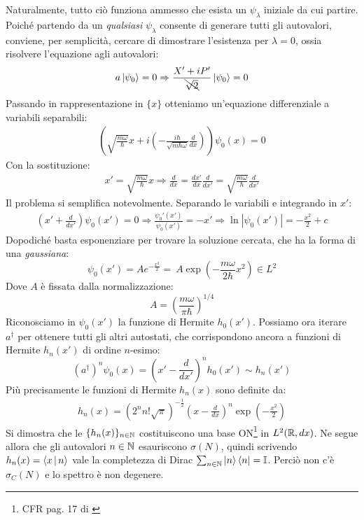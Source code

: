 \documentclass[../../FisicaTeorica.tex]{subfiles}
\begin{document}
Naturalmente, tutto ciò funziona ammesso che esista un $\psi_\lambda$ iniziale da cui partire. Poiché partendo da un \textit{qualsiasi} $\psi_\lambda$ consente di generare tutti gli autovalori, conviene, per semplicità, cercare di dimostrare l'esistenza per $\lambda=0$, ossia risolvere l'equazione agli autovalori:
\begin{align*}
a\Ket{\psi_0} = 0 \Rightarrow \frac{X'+iP'}{\bcancel{\sqrt{2}}} \Ket{\psi_0} = 0
\end{align*}
Passando in rappresentazione in $\{x\}$ otteniamo un'equazione differenziale a variabili separabili:
\begin{align*}
\left(\sqrt{\frac{m\omega}{\hbar}}
x+i\left(-\frac{i\hbar}{\sqrt{m\hbar \omega}}\frac{d}{dx} \right)
\right)\psi_0(x) =0
\end{align*}
Con la sostituzione:
\begin{align*}
x'=\sqrt{\frac{m\omega}{\hbar}}x \Rightarrow \frac{d}{dx} = \frac{dx'}{dx} \frac{d}{dx'} = \sqrt{\frac{m\omega}{\hbar}} \frac{d}{dx'}
\end{align*}
Il problema si semplifica notevolmente. Separando le variabili e integrando in $x'$:
\begin{align*}
\left(x'+\frac{d}{dx'}\right)\psi_0 (x') = 0 \Rightarrow \frac{\psi_0'(x')}{\psi_0(x')}=-x' \Rightarrow \ln|\psi_0(x')|=-\frac{x^2}{2}+c
\end{align*}
Dopodiché basta esponenziare per trovare la soluzione cercata, che ha la forma di una \textit{gaussiana}:
\[
\psi_0(x') = Ae^{-\frac{x^2}{2}} =\ A \exp\left(-\frac{m\omega}{2\hbar}x^2\right) \in L^2
\]
Dove $A$ è fissata dalla normalizzazione:
\[
A = \left(\frac{m\omega}{\pi \hbar}\right)^{1/4}
\]
Riconosciamo in $\psi_0(x')$ la funzione di Hermite $h_0(x')$. Possiamo ora iterare  $a^\dag$ per ottenere tutti gli altri autostati, che corrispondono ancora a funzioni di Hermite $h_n(x')$ di ordine $n$-esimo:
\[
(a^\dag)^n \psi_0(x) = \left(x'-\frac{d}{dx'}\right)^n h_0(x') \sim h_n(x')
\]
Più precisamente le funzioni di Hermite $h_n(x)$ sono definite da:
\begin{align*}
    h_n(x) = \left(2^n n! \sqrt{\pi}\right)^{-\frac{1}{2}}\left( x - \frac{d}{dx}\right)^n \exp\left(-\frac{x^2}{2}\right)
\end{align*}
Si dimostra che le $\{h_n(x)\}_{n\in \mathbb{N}}$ costituiscono una base ON\footnote{CFR pag. 17 di \cite{spazi_hilbert}} in $L^2(\mathbb{R},dx)$. Ne segue allora che gli autovalori $n\in \mathbb{N}$ esauriscono $\sigma(N)$, quindi scrivendo $h_n(x)=\Braket{x|n}$ vale la completezza di Dirac $\sum_{n\in \mathbb{N}}\Ket{n}\Bra{n}=\mathbb{I}$. Perciò non c'è $\sigma_C(N)$ e lo spettro è non degenere.\\
\end{document}
